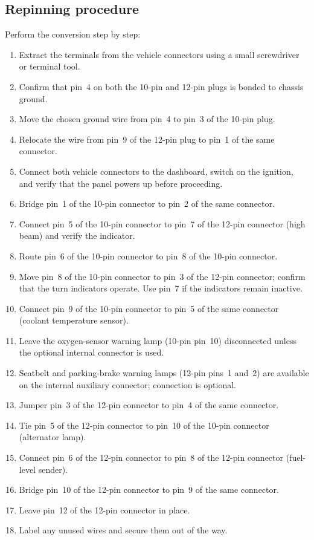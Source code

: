 \subsection{Repinning procedure}
Perform the conversion step by step:
\begin{enumerate}
    \item Extract the terminals from the vehicle connectors using a small screwdriver or terminal tool.
    \item Confirm that pin~4 on both the 10-pin and 12-pin plugs is bonded to chassis ground.
    \item Move the chosen ground wire from pin~4 to pin~3 of the 10-pin plug.
    \item Relocate the wire from pin~9 of the 12-pin plug to pin~1 of the same connector.
    \item Connect both vehicle connectors to the dashboard, switch on the ignition, and verify that the panel powers up before proceeding.
    \item Bridge pin~1 of the 10-pin connector to pin~2 of the same connector.
    \item Connect pin~5 of the 10-pin connector to pin~7 of the 12-pin connector (high beam) and verify the indicator.
    \item Route pin~6 of the 10-pin connector to pin~8 of the 10-pin connector.
    \item Move pin~8 of the 10-pin connector to pin~3 of the 12-pin connector; confirm that the turn indicators operate. Use pin~7 if the indicators remain inactive.
    \item Connect pin~9 of the 10-pin connector to pin~5 of the same connector (coolant temperature sensor).
    \item Leave the oxygen-sensor warning lamp (10-pin pin~10) disconnected unless the optional internal connector is used.
    \item Seatbelt and parking-brake warning lamps (12-pin pins~1 and~2) are available on the internal auxiliary connector; connection is optional.
    \item Jumper pin~3 of the 12-pin connector to pin~4 of the same connector.
    \item Tie pin~5 of the 12-pin connector to pin~10 of the 10-pin connector (alternator lamp).
    \item Connect pin~6 of the 12-pin connector to pin~8 of the 12-pin connector (fuel-level sender).
    \item Bridge pin~10 of the 12-pin connector to pin~9 of the same connector.
    \item Leave pin~12 of the 12-pin connector in place.
    \item Label any unused wires and secure them out of the way.
\end{enumerate}

